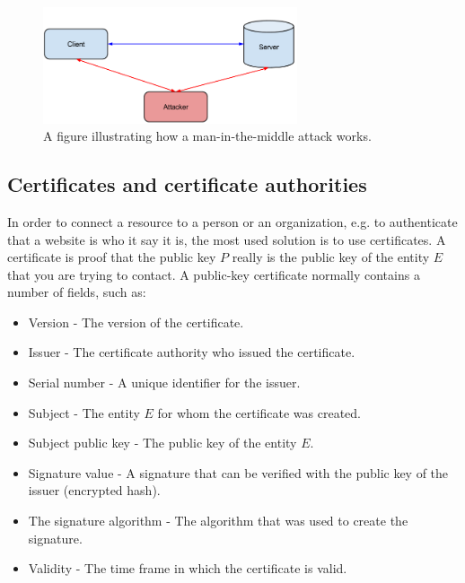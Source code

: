 \documentclass[frame, english]{idamasterthesis}
\begin{document}
\begin{figure}[h!]      %
    \centering
    \includegraphics[width = 75mm]{Pics/mitm.png}
    \caption{A figure illustrating how a man-in-the-middle attack works.}
    \label{fig:mitm}
\end{figure}

\pagebreak

\subsection{Certificates and certificate authorities}
In order to connect a resource to a person or an organization, e.g. to authenticate that a website is who it say it is, the most used solution is to use certificates. A certificate is proof that the public key $P$ really is the public key of the entity $E$ that you are trying to contact. A public-key certificate normally contains a number of fields, such as: 
\begin{itemize}[noitemsep]
    \item Version - The version of the certificate.
    \item Issuer - The certificate authority who issued the certificate.
    \item Serial number - A unique identifier for the issuer.
    \item Subject - The entity $E$ for whom the certificate was created. 
    \item Subject public key - The public key of the entity $E$.
    \item Signature value - A signature that can be verified with the public key of the issuer (encrypted hash).
    \item The signature algorithm - The algorithm that was used to create the signature.
    \item Validity - The time frame in which the certificate is valid. 
\end{itemize}
\end{document}
